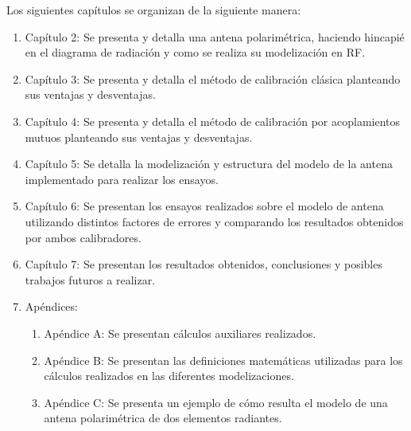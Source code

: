 Los siguientes capítulos se organizan de la siguiente manera:

\begin{enumerate}
	\item Capítulo 2: Se presenta y detalla una antena polarimétrica, haciendo hincapié en el diagrama de radiación y como
    se realiza su modelización en RF.
	\item Capítulo 3: Se presenta y detalla el método de calibración clásica planteando sus ventajas y desventajas.
	\item Capítulo 4: Se presenta y detalla el método de calibración por acoplamientos mutuos planteando sus ventajas y
		desventajas.
	\item Capítulo 5: Se detalla la modelización y estructura del modelo de la antena implementado para realizar los ensayos.
	\item Capítulo 6: Se presentan los ensayos realizados sobre el modelo de antena utilizando distintos factores de errores y
		comparando los resultados obtenidos por ambos calibradores.
	\item Capítulo 7: Se presentan los resultados obtenidos, conclusiones y posibles trabajos futuros a realizar.
	\item Apéndices:
		\begin{enumerate}
			\item Apéndice A: Se presentan cálculos auxiliares realizados.
			\item Apéndice B: Se presentan las definiciones matemáticas utilizadas para los cálculos realizados en las diferentes 
				modelizaciones.
			\item Apéndice C: Se presenta un ejemplo de cómo resulta el modelo de una antena polarimétrica de dos elementos radiantes.
		\end{enumerate}
\end{enumerate}

